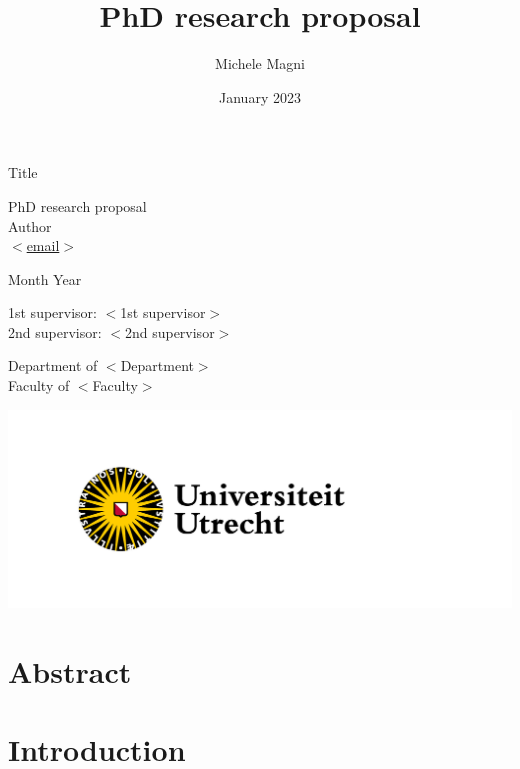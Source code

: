 \documentclass[a4paper,12pt]{article}
\author{Michele Magni}
\title{PhD research proposal}
\date{January 2023}
\begin{document}
	
	\begin{center}
	\thispagestyle{empty}
		\begin{LARGE}
		Title  \\[1 cm] \vfill
		\end{LARGE}
			
			
		\begin{Large}
			PhD research proposal \\ [1 cm]\vfill
			Author \\
			\href{mailto:<email>}{$<$email$>$} \\[1 cm]\vfill
			
			
			Month Year\\[1 cm]\vfill
			
			1st supervisor: $<$1st supervisor$>$ \\ 
			2nd supervisor: $<$2nd supervisor$>$ \\[1 cm]\vfill
			
			Department of $<$Department$>$ \\
			Faculty of $<$Faculty$>$ \\
			\centerline{
			\includegraphics[trim={0cm 1cm 2.1cm 0.5cm},clip]{../figures/UU_logo_2021_NL_RGB.jpg}
			}
			
		\end{Large}
	\end{center}
	
	\newpage
	{\setlength\parskip{\fill}
		\tableofcontents
	}

	\newpage
	
	\section*{Abstract}
		
    \newpage
	\section{Introduction}
 
\end{document}
